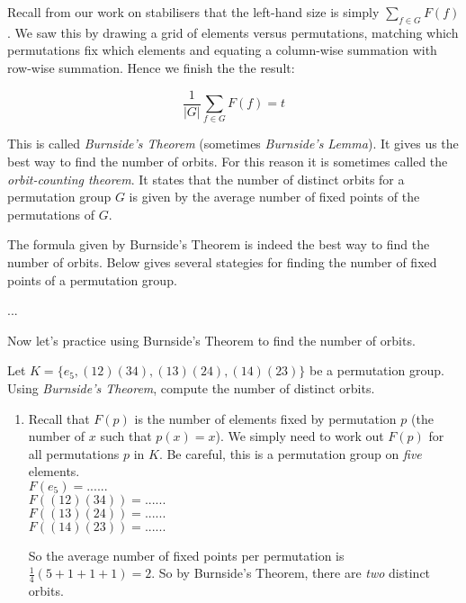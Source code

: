 Recall from our work on stabilisers that the left-hand size is simply $\sum_{f \in G} F(f)$. 
We saw this by drawing a grid of elements versus permutations, matching which permutations 
fix which elements and equating a column-wise summation with row-wise summation. 
Hence we finish the the result:

$$\frac{1}{|G|}\sum_{f \in G} F(f) = t$$

This is called \textit{Burnside's Theorem} (sometimes \textit{Burnside's Lemma}). 
It gives us the best way to find the number of orbits. For this reason 
it is sometimes called the \textit{orbit-counting theorem}. It states 
that the number of distinct orbits for a permutation group $G$ 
is given by the average number of fixed points 
of the permutations of $G$.


The formula given by Burnside's Theorem is indeed the best way to 
find the number of orbits. Below gives several stategies for finding the number 
of fixed points of a permutation group. 

...

Now let's practice using Burnside's Theorem to find the number of orbits.

\frmrule

\begin{example}
Let $K = \{e_5, (12)(34), (13)(24), (14)(23)\}$ be a permutation group. \\
Using \textit{Burnside's Theorem}, compute the number of distinct orbits. 

\begin{enumerate}
\item 
Recall that $F(p)$ is the number of elements fixed by permutation $p$ (the number of $x$ such that $p(x) = x$). 
We simply need to work out $F(p)$ for all permutations $p$ in $K$. 
Be careful, this is a permutation group on \textit{five} elements.\\
$F(e_5) = ...... $ \\
$F((12)(34)) = ...... $ \\
$F((13)(24)) = ...... $ \\
$F((14)(23)) = ...... $ 

So the average number of fixed points per permutation is $\frac{1}{4}(5+1+1+1) = 2$. 
So by Burnside's Theorem, there are \textit{two} distinct orbits. 
\end{enumerate}

\end{example}


\frmrule
